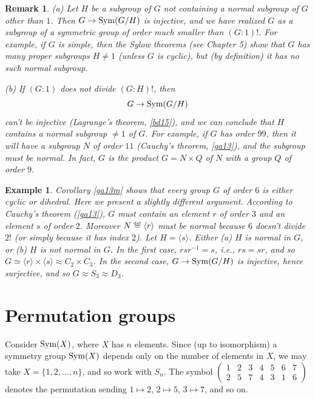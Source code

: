 \documentclass[a4paper,11pt,final]{memoir}%
\newtheorem{example}[X]{Example}
\newtheorem{remark}[X]{Remark}
\theoremstyle{nonumberplain}
\begin{document}
\begin{remark}
\label{ga19} (a) Let $H$ be a subgroup of $G$ not containing a normal subgroup
of $G$ other than $1$. Then $G\rightarrow\operatorname{Sym}(G/H)$ is injective, and we have
realized $G$ as a subgroup of a symmetric group of order much smaller than
$(G:1)!$. For example, if $G$ is simple, then the Sylow theorems (see Chapter
5) show that $G$ has many proper subgroups $H\neq1$ (unless $G$ is cyclic),
but (by definition) it has no such normal subgroup.

(b) If $(G:1)$ does not divide $(G:H)!$, then
\[
G\rightarrow\operatorname{Sym}(G/H)
\]
can't be injective (Lagrange's theorem, \ref{bd15}), and we can conclude that
$H$ contains a normal subgroup $\neq1$ of $G$. For example, if $G$ has order
$99$, then it will have a subgroup $N$ of order $11$ (Cauchy's theorem,
\ref{ga13}), and the subgroup must be normal. In fact, $G$ is the product
$G=N\times Q$ of $N$ with a group $Q$ of order $9$.
\end{remark}

\begin{example}
\label{ga20} Corollary \ref{ga13m} shows that every group $G$ of order $6$ is
either cyclic or dihedral. Here we present a slightly different argument.
According to Cauchy's theorem (\ref{ga13}), $G$ must contain an element $r$ of
order $3$ and an element $s$ of order $2$. Moreover
$N\overset{\df}{=}\langle r\rangle$ must be normal because $6$
doesn't divide $2!$ (or simply because it has index $2$). Let $H=\langle
s\rangle$. Either (a) $H$ is normal in $G$, or (b) $H$ is not normal in $G$.
In the first case, $rsr^{-1}=s$, i.e., $rs=sr$, and so $G\simeq\langle
r\rangle\times\langle s\rangle\approx C_{2}\times C_{3}$. In the second case,
$G\rightarrow\operatorname{Sym}(G/H)$ is injective, hence surjective, and so $G\approx
S_{3}\approx D_{3}$.
\end{example}

\section{Permutation groups}

Consider $\operatorname{Sym}(X)$, where $X$ has $n$ elements. Since (up to isomorphism) a
symmetry group $\operatorname{Sym}(X)$ depends only on the number of elements in $X$, we may
take $X=\{1,2,\ldots,n\}$, and so work with $S_{n}$. The symbol $\left(
\begin{smallmatrix}
1 & 2 & 3 & 4 & 5 & 6 & 7\\
2 & 5 & 7 & 4 & 3 & 1 & 6
\end{smallmatrix}
\right)  $ denotes the permutation sending $1\mapsto2$, $2\mapsto5$,
$3\mapsto7$, and so on.
\end{document}
